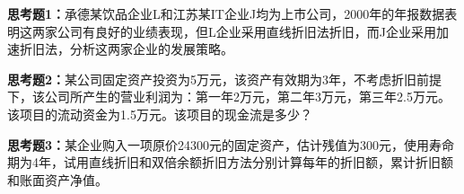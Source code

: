 \textbf{思考题1：}承德某饮品企业L和江苏某IT企业J均为上市公司，2000年的年报数据表明这两家公司有良好的业绩表现，但L企业采用直线折旧法折旧，而J企业采用加速折旧法，分析这两家企业的发展策略。

\textbf{思考题2：}某公司固定资产投资为5万元，该资产有效期为3年，不考虑折旧前提下，该公司所产生的营业利润为：第一年2万元，第二年3万元，第三年2.5万元。该项目的流动资金为1.5万元。该项目的现金流是多少？

\textbf{思考题3：}某企业购入一项原价24300元的固定资产，估计残值为300元，使用寿命期为4年，试用直线折旧和双倍余额折旧方法分别计算每年的折旧额，累计折旧额和账面资产净值。